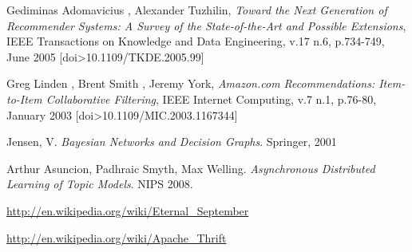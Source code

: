\documentclass[11pt,letterpaper]{article}
\begin{document}
\newpage
\newpage
\begin{thebibliography}{6}
   Gediminas Adomavicius , Alexander Tuzhilin, \textit{Toward the Next Generation of Recommender Systems: A Survey of the State-of-the-Art and Possible Extensions}, IEEE Transactions on Knowledge and Data Engineering, v.17 n.6, p.734-749, June 2005  [doi>10.1109/TKDE.2005.99]

   Greg Linden , Brent Smith , Jeremy York, \textit{Amazon.com Recommendations: Item-to-Item Collaborative Filtering}, IEEE Internet Computing, v.7 n.1, p.76-80, January 2003  [doi>10.1109/MIC.2003.1167344]

   Jensen, V. \textit{Bayesian Networks and Decision Graphs}. Springer, 2001

   Arthur Asuncion, Padhraic Smyth, Max Welling. \textit{Asynchronous Distributed Learning of Topic Models}. NIPS 2008.

   \url{http://en.wikipedia.org/wiki/Eternal\_September}

   \url{http://en.wikipedia.org/wiki/Apache\_Thrift}

\end{thebibliography}
\end{document}
